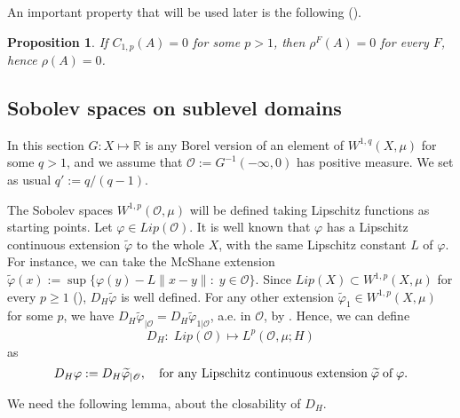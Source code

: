 \documentclass[reqno,twoside,12pt]{amsart}
\newtheorem{Proposition}[Theorem]{Proposition}
\begin{document}
An important property that will be used later is the following (\cite[Thm. 9]{FP}).

\begin{Proposition}
\label{pr:cap}
If $C_{1,p}(A) =0$ for some $p>1$, then $\rho^F(A) =0$ for every $F$, hence $\rho(A)=0$. 
\end{Proposition}

\subsection{Sobolev spaces on sublevel domains}
\label{Sobolev}

In this section $G:X\mapsto {\mathbb R}$ is any  Borel version of an element of $W^{1,q}(X, \mu)$ for some $q>1$, and 
we assume  that  ${\mathcal O} := G^{-1}(-\infty, 0)$ has positive measure. We set as usual $q':=q/(q-1)$.
   
The Sobolev spaces $W^{1,p}({\mathcal O}, \mu)$ will be defined taking Lipschitz functions as starting points. Let $\varphi\in Lip({\mathcal O})$. It is well known that $\varphi$ has a Lipschitz continuous  extension $\widetilde{\varphi}$ to the whole $X$, with the same Lipschitz constant $L$ of $\varphi$. For instance, we can take the McShane extension $\widetilde{\varphi}(x) := \sup\{ \varphi(y) - L\|x-y\|:\;y\in {\mathcal O}\}$. 
Since $Lip(X)\subset W^{1,p}(X, \mu)$ for every $p\geq 1$  (\cite[Ex. 5.4.10]{Boga}), $D_H \widetilde{\varphi}$ is well defined. For any other extension 
$\widetilde{\varphi}_1 \in W^{1,p}(X, \mu)$ for some $p$, we have $D_H \widetilde{\varphi}_{|{\mathcal O}} = D_H \widetilde{\varphi}_{1|{\mathcal O}} $, a.e. in ${\mathcal O}$, by \cite[Lemma 5.7.7]{Boga}. Hence, we can define
$$D_H: \;Lip({\mathcal O})\mapsto L^p({\mathcal O}, \mu; H)$$
as 
$$D_H\varphi := D_H \widetilde{\varphi}_{|{\mathcal O}}, \quad \mbox{\rm for any Lipschitz continuous extension}\;\widetilde{\varphi}\; \mbox{\rm of}\;\varphi.$$

We need the following lemma, about the closability of $D_H$. 
 
\end{document}
